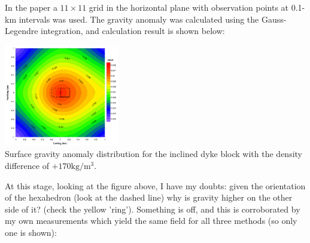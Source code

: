 In the paper a $11 \times 11$ grid in the horizontal plane with observation
points at 0.1-km intervals was used. The gravity anomaly
was calculated using the Gauss-Legendre integration, and calculation result is shown below:

\begin{center}
\includegraphics[width=5cm]{python_codes/fieldstone_113/images/uwms19_b}\\
{\captionfont Surface gravity anomaly distribution for the inclined dyke
block with the density difference of $+170 \si{\kg\per\cubic\meter}$.}
\end{center}

At this stage, looking at the figure above, I have my doubts: given the orientation of
the hexahedron (look at the dashed line) why is gravity higher on the other side of it?
(check the yellow 'ring'). Something is off, and this is corroborated by my own 
measurements which yield the same field for all three methods (so only one is shown): 

